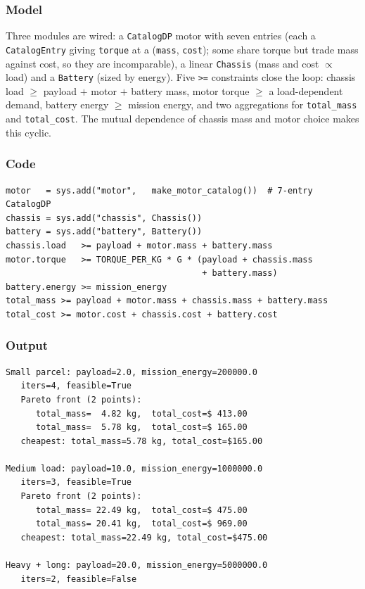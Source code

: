 \documentclass[11pt,a4paper]{article}
\begin{document}
\subsubsection*{Model}

Three modules are wired: a \texttt{CatalogDP} motor with seven entries
(each a \texttt{CatalogEntry} giving \texttt{torque} at a
(\texttt{mass}, \texttt{cost}); some share torque but trade mass against
cost, so they are incomparable), a linear \texttt{Chassis} (mass and cost
$\propto$ load) and a \texttt{Battery} (sized by energy). Five \texttt{>=}
constraints close the loop: chassis load $\ge$ payload $+$ motor $+$
battery mass, motor torque $\ge$ a load-dependent demand, battery energy
$\ge$ mission energy, and two aggregations for \texttt{total\_mass} and
\texttt{total\_cost}. The mutual dependence of chassis mass and motor
choice makes this cyclic.

\subsubsection*{Code}

\begin{lstlisting}
motor   = sys.add("motor",   make_motor_catalog())  # 7-entry CatalogDP
chassis = sys.add("chassis", Chassis())
battery = sys.add("battery", Battery())
chassis.load   >= payload + motor.mass + battery.mass
motor.torque   >= TORQUE_PER_KG * G * (payload + chassis.mass
                                       + battery.mass)
battery.energy >= mission_energy
total_mass >= payload + motor.mass + chassis.mass + battery.mass
total_cost >= motor.cost + chassis.cost + battery.cost
\end{lstlisting}

\subsubsection*{Output}

\begin{lstlisting}[language={},numbers=none,keywordstyle={}]
Small parcel: payload=2.0, mission_energy=200000.0
   iters=4, feasible=True
   Pareto front (2 points):
      total_mass=  4.82 kg,  total_cost=$ 413.00
      total_mass=  5.78 kg,  total_cost=$ 165.00
   cheapest: total_mass=5.78 kg, total_cost=$165.00

Medium load: payload=10.0, mission_energy=1000000.0
   iters=3, feasible=True
   Pareto front (2 points):
      total_mass= 22.49 kg,  total_cost=$ 475.00
      total_mass= 20.41 kg,  total_cost=$ 969.00
   cheapest: total_mass=22.49 kg, total_cost=$475.00

Heavy + long: payload=20.0, mission_energy=5000000.0
   iters=2, feasible=False
\end{lstlisting}
\end{document}
